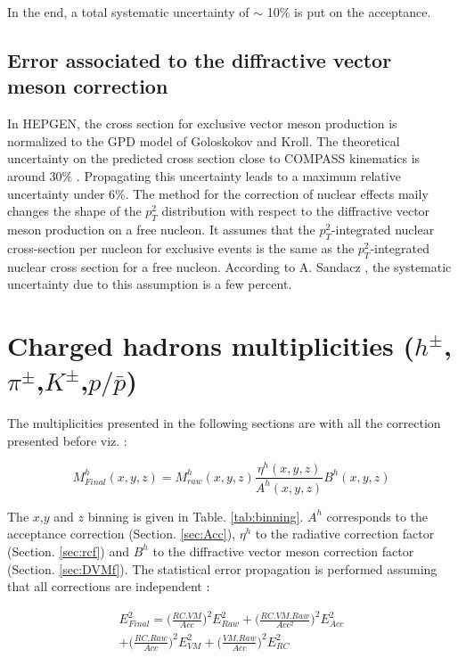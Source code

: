In the end, a total systematic uncertainty of $\sim$ 10\% is put on the acceptance.


\subsection{Error associated to the diffractive vector meson correction}

In HEPGEN, the cross section for exclusive vector meson production is normalized to the GPD model of Goloskokov and Kroll. The theoretical uncertainty on the predicted cross section close to COMPASS kinematics is around 30\% \cite{Goloskokov}. Propagating this uncertainty leads to a maximum relative uncertainty under 6\%.
The method for the correction of nuclear effects maily changes the shape of the $p_T^2$ distribution with respect to the diffractive vector meson production on a free nucleon. It assumes that the $p_T^2$-integrated nuclear cross-section per nucleon for exclusive events is the same as the $p_T^2$-integrated nuclear cross section for a free nucleon. According to A. Sandacz \cite{Hepgen}, the systematic uncertainty due to this assumption is a few percent.


\section{Charged hadrons multiplicities ($h^{\pm}$,$\pi^{\pm}$,$K^{\pm}$,$p/\bar{p}$)}

The multiplicities presented in the following sections are with all the correction presented before viz. :

\begin{equation}
  	M^h_{Final}(x,y,z) = M^h_{raw}(x,y,z)\frac{\eta^h(x,y,z)}{A^h(x,y,z)}B^h(x,y,z)
\end{equation}

The $x$,$y$ and $z$ binning is given in Table. \ref{tab:binning}. $A^h$ corresponds to the acceptance correction (Section. \ref{sec:Acc}), $\eta^h$ to the radiative correction factor (Section. \ref{sec:rcf}) and $B^h$ to the diffractive vector meson correction factor (Section. \ref{sec:DVMf}). The statistical error propagation is performed assuming that all corrections are independent :

\begin{equation}
\begin{split}
		E^2_{Final} = \bigg( \frac{RC.VM}{Acc} \bigg)^2 E^2_{Raw} + \bigg(\frac{RC.VM.Raw}{Acc^2} \bigg)^2 E^2_{Acc} \\
		+ \bigg(\frac{RC.Raw}{Acc} \bigg)^2 E^2_{VM} + \bigg(\frac{VM.Raw}{Acc} \bigg)^2 E^2_{RC}
\end{split}
\end{equation}

